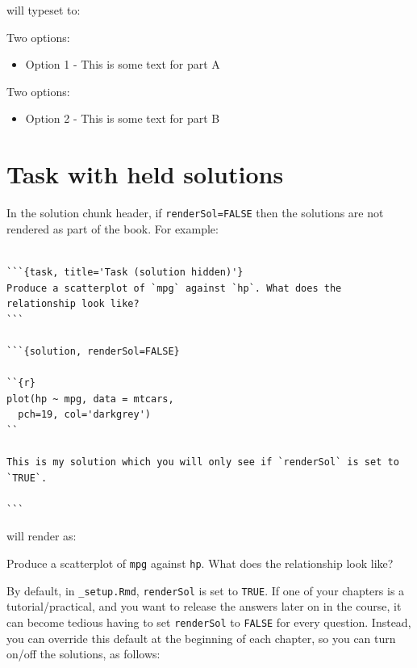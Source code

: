\documentclass[
]{book}
\providecommand{\tightlist}{%
  \setlength{\itemsep}{0pt}\setlength{\parskip}{0pt}}
\newcommand{\bblockT}[2][Task]{\begin{tcolorbox}[title = #1 #2, parbox = false]}
\newcommand{\eblockT}{\end{tcolorbox}}
\newcommand{\bmp}{\begin{minipage}[c]{0.5\textwidth}}
\newcommand{\emp}{\end{minipage}}
\newcommand{\bblockST}[1]{\begin{tcolorbox}[title = #1, colframe=taskCol1, breakable, parbox = false]}
\newcommand{\eblockST}{\end{tcolorbox}}
\theoremstyle{definition}
\theoremstyle{definition}
\theoremstyle{definition}
\theoremstyle{remark}
\begin{document}
will typeset to:

\bmp
\bblockST{Part A}

Two options:

\begin{itemize}
\tightlist
\item
  Option 1 - This is some text for part A
\end{itemize}

\eblockST
\emp
\hspace{0.01\textwidth}
\bmp\bblockST{Part B}

Two options:

\begin{itemize}
\tightlist
\item
  Option 2 - This is some text for part B
\end{itemize}

\eblockST
\emp

\hypertarget{task-with-held-solutions}{%
\section{Task with held solutions}\label{task-with-held-solutions}}

In the solution chunk header, if \texttt{renderSol=FALSE} then the solutions are not rendered as part of the book. For example:

\begin{verbatim}

```{task, title='Task (solution hidden)'}
Produce a scatterplot of `mpg` against `hp`. What does the relationship look like?
```

```{solution, renderSol=FALSE}

``{r}
plot(hp ~ mpg, data = mtcars, 
  pch=19, col='darkgrey')
``

This is my solution which you will only see if `renderSol` is set to `TRUE`.

```
\end{verbatim}

will render as:

\hypertarget{tsk7}{}\bblockT[Task (solution hidden)]{\phantomsection\label{sol7}7}

Produce a scatterplot of \texttt{mpg} against \texttt{hp}. What does the relationship look like?
\eblockT

By default, in \texttt{\_setup.Rmd}, \texttt{renderSol} is set to \texttt{TRUE}. If one of your chapters is a tutorial/practical, and you want to release the answers later on in the course,
it can become tedious having to set \texttt{renderSol} to \texttt{FALSE} for every question.
Instead, you can override this default at the beginning of each chapter, so you can turn on/off the solutions, as follows:
\end{document}
